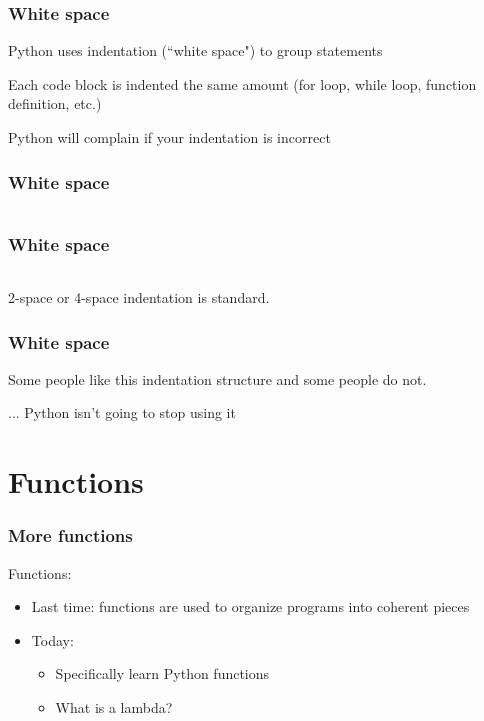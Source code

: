 \documentclass{beamer}
\begin{document}
\begin{frame}
\frametitle{White space}

Python uses indentation (``white space") to group statements

\vspace{0.15in}

Each code block is indented the same amount (for loop, while loop, function definition, etc.)

\vspace{0.15in}

Python will complain if your indentation is incorrect
\end{frame}

\begin{frame}
\frametitle{White space}

\begin{center}
\begin{tabular}{c}

\end{tabular}
\end{center}

\end{frame}


\begin{frame}
\frametitle{White space}

\begin{center}
\begin{tabular}{c}

\end{tabular}
\end{center}

2-space or 4-space indentation is standard.

\end{frame}

\begin{frame}
\frametitle{White space}

Some people like this indentation structure and some people do not.

\vspace{0.2in}

... Python isn't going to stop using it

\end{frame}

\section{Functions}

\begin{frame}
\frametitle{More functions}

Functions:
\begin{itemize}
\setlength{\itemsep}{0.15in}
\item{Last time: functions are used to organize programs into coherent pieces}
\item{Today:
\begin{itemize}
  \setlength{\itemsep}{0.1in}
  \item{Specifically learn Python functions}
  \item{What is a lambda?}
\end{itemize}
}
\end{itemize}

\end{frame}
\end{document}
